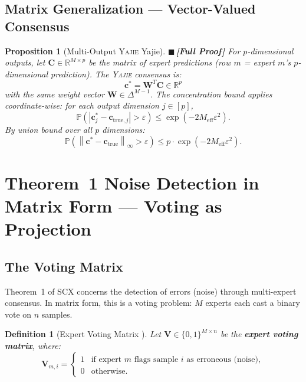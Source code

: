 \documentclass[12pt,a4paper]{article}
\newtheorem{proposition}[theorem]{Proposition}
\newtheorem{definition}[theorem]{Definition}
\theoremstyle{definition}
\newcommand{\rigorFull}{{\color{rigorcolor}$\blacksquare$\,\textbf{[Full Proof]}}}
\newcommand{\Yajie}{\textsc{Yajie}}
\newcommand{\SCX}{\textsc{SCX}}
\newcommand{\R}{\mathbb{R}}
\newcommand{\Pbb}{\mathbb{P}}
\newcommand{\norm}[1]{\left\lVert#1\right\rVert}
\newcommand{\abs}[1]{\left|#1\right|}
\newcommand{\mat}[1]{\mathbf{#1}}
\newcommand{\simplex}{\Delta}
\begin{document}
\subsection{Matrix Generalization — Vector-Valued Consensus }

\begin{proposition}[Multi-Output \Yajie{} Yajie]\label{prop:yajie_multioutput}
\rigorFull
For $p$-dimensional outputs, let $\mat{C} \in \R^{M \times p}$ be the matrix of expert 
predictions (row $m$ = expert $m$'s $p$-dimensional prediction). The \Yajie{} consensus is:
\begin{equation}\label{eq:yajie_multi}
    \mat{c}^* = \mat{W}^T \mat{C} \in \R^p
\end{equation}
with the same weight vector $\mat{W} \in \simplex^{M-1}$. The concentration bound applies
coordinate-wise: for each output dimension $j \in [p]$,
\[
\Pbb\left(\abs{\mat{c}^*_j - \mat{c}_{\text{true},j}} > \varepsilon\right) \leq \exp(-2M_{\text{eff}}\varepsilon^2).
\]
By union bound over all $p$ dimensions:
\[
\Pbb\left(\norm{\mat{c}^* - \mat{c}_{\text{true}}}_\infty > \varepsilon\right) \leq p \cdot \exp(-2M_{\text{eff}}\varepsilon^2).
\]
\end{proposition}

\section{Theorem~1 Noise Detection in Matrix Form — Voting as Projection }
\label{sec:noise_matrix}

\subsection{The Voting Matrix }

Theorem~1 of \SCX{} concerns the detection of errors (noise) through multi-expert 
consensus. In matrix form, this is a voting problem: $M$ experts each cast a binary 
vote on $n$ samples.

\begin{definition}[Expert Voting Matrix ]\label{def:voting_matrix}
Let $\mat{V} \in \{0,1\}^{M \times n}$ be the \textbf{expert voting matrix}, where:
\[
\mat{V}_{m,i} = \begin{cases}
    1 & \text{if expert $m$ flags sample $i$ as erroneous (noise)}, \\
    0 & \text{otherwise}.
\end{cases}
\]
\end{definition}
\end{document}
